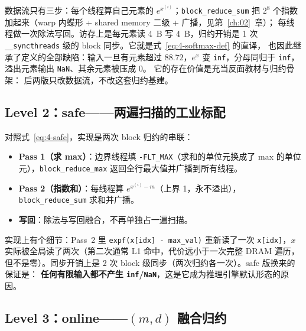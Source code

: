 

数据流只有三步：每个线程算自己元素的 $e^{x^{(i)}}$；\texttt{block\_\allowbreak{}reduce\_\allowbreak{}sum} 把
$2^{8}$ 个指数加起来（warp 内蝶形 + shared memory 二级 + 广播，见第~\ref{ch:02}~章）；
每线程做一次除法写回。访存上是每元素读 4~B 写 4~B，归约开销是 1 次
\texttt{\_\allowbreak{}\_\allowbreak{}syncthreads} 级的 block 同步。它就是式~\ref{eq:4-softmax-def} 的直译，
也因此继承了定义的全部缺陷：输入一旦有元素超过 $88.72$，$e^{x}$ 变
\texttt{inf}，分母同归于 \texttt{inf}，溢出元素输出 \texttt{NaN}、其余元素被压成 0。
它的存在价值是充当反面教材与归约骨架：
后两版只改数据流，不改这套归约基建。

\subsection{Level 2：safe——两遍扫描的工业标配}



对照式~\ref{eq:4-safe}，实现是两次 block 归约的串联：
\begin{itemize}
  \item \textbf{Pass 1（求 max）}：边界线程填 \texttt{-FLT\_MAX}（求和的单位元换成了
        max 的单位元），\texttt{block\_\allowbreak{}reduce\_\allowbreak{}max} 返回全行最大值并广播到所有线程。
  \item \textbf{Pass 2（指数和）}：每线程算 $e^{x^{(i)} - m}$（上界 1，永不溢出），
        \texttt{block\_\allowbreak{}reduce\_\allowbreak{}sum} 求和并广播。
  \item \textbf{写回}：除法与写回融合，不再单独占一遍扫描。
\end{itemize}
实现上有个细节：Pass~2 里 \texttt{expf(x[idx] - max\_val)} 重新读了一次
\texttt{x[idx]}，$x$ 实际被全局读了两次（第二次通常 L1 命中，代价远小于一次完整 DRAM 遍历，
但不是零）。同步开销上是 2 次 block 级同步（两次归约各一次）。safe 版换来的保证是：
\textbf{任何有限输入都不产生 \texttt{inf}/\texttt{NaN}}，这是它成为推理引擎默认形态的原因。

\subsection{Level 3：online——$(m,d)$ 融合归约}



